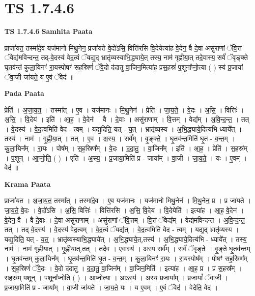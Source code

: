 \documentclass[17pt]{extarticle}
\begin{document}
\section*{ TS 1.7.4.6 }

\textbf{TS 1.7.4.6 } \newline
\textbf{Samhita Paata} \newline

प्राजा॑यत॒ तस्मा॑दे॒व यज॑मानो मिथु॒नेन॒ प्रजा॑यते वे॒दो॑ऽसि॒ वित्ति॑रसि वि॒देयेत्या॑ह वे॒देन॒ वै दे॒वा असु॑राणां ॅवि॒त्तं ॅवेद्य॑मविन्दन्त॒ तद्-वे॒दस्य॑ वेद॒त्वं ॅयद्य॒द् भ्रातृ॑व्यस्याभि॒द्ध्याये॒त् तस्य॒ नाम॑ गृह्णीया॒त् तदे॒वास्य॒ सर्वं॑ ॅवृङ्क्ते घृ॒तव॑न्तं कुला॒यिनꣳ॑ रा॒यस्पोषꣳ॑ सह॒स्रिणं॑ ॅवे॒दो द॑दातु वा॒जिन॒मित्या॑ह॒ प्रस॒हस्रं॑ प॒शूना᳚प्नो॒त्या ( ) स्य॑ प्र॒जायां᳚ ॅवा॒जी जा॑यते॒ य ए॒वं ॅवेद॑ ॥ \newline

\textbf{Pada Paata} \newline

प्रेति॑ । अ॒जा॒य॒त॒ । तस्मा᳚त् । ए॒व । यज॑मानः । मि॒थु॒नेन॑ । प्रेति॑ । जा॒य॒ते॒ । वे॒दः । अ॒सि॒ । वित्तिः॑ । अ॒सि॒ । वि॒देय॑ । इति॑ । आ॒ह॒ । वे॒देन॑ । वै । दे॒वाः । असु॑राणाम् । वि॒त्तम् । वेद्य᳚म् । अ॒वि॒न्द॒न्त॒ । तत् । वे॒दस्य॑ । वे॒द॒त्वमिति॑ वेद - त्वम् । यद्य॒दिति॒ यत् - य॒त् । भ्रातृ॑व्यस्य । अ॒भि॒द्ध्याये॒दित्य॑भि-ध्याये᳚त् । तस्य॑ । नाम॑ । गृ॒ह्णी॒या॒त् । तत् । ए॒व । अ॒स्य॒ । सर्व᳚म् । वृ॒ङ्क्ते॒ । घृ॒तव॑न्त॒मिति॑ घृ॒त - व॒न्त॒म् । कु॒ला॒यिन᳚म् । रा॒यः । पोष᳚म् । स॒ह॒स्रिण᳚म् । वे॒दः । द॒दा॒तु॒ । वा॒जिन᳚म् । इति॑ । आ॒ह॒ । प्रेति॑ । स॒हस्र᳚म् । प॒शून् । आ॒प्नो॒ति॒ ( ) । एति॑ । अ॒स्य॒ । प्र॒जाया॒मिति॑ प्र - जाया᳚म् । वा॒जी । जा॒य॒ते॒ । यः । ए॒वम् । वेद॑ ॥  \newline


\textbf{Krama Paata} \newline

प्राजा॑यत । अ॒जा॒य॒त॒ तस्मा᳚त् । तस्मा॑दे॒व । ए॒व यज॑मानः । यज॑मानो मिथु॒नेन॑ । मि॒थु॒नेन॒ प्र । प्र जा॑यते । जा॒य॒ते॒ वे॒दः । वे॒दो॑ऽसि । अ॒सि॒ वित्तिः॑ । वित्ति॑रसि । अ॒सि॒ वि॒देय॑ । वि॒देयेति॑ । इत्या॑ह । आ॒ह॒ वे॒देन॑ । वे॒देन॒ वै । वै दे॒वाः । दे॒वा असु॑राणाम् । असु॑राणां ॅवि॒त्तम् । वि॒त्तं ॅवेद्य᳚म् । वेद्य॑मविन्दन्त । अ॒वि॒न्द॒न्त॒ तत् । तद् वे॒दस्य॑ । वे॒दस्य॑ वेद॒त्वम् । वे॒द॒त्वं ॅयद्य॑त् । वे॒द॒त्वमिति॑ वेद - त्वम् । यद्य॒द् भ्रातृ॑व्यस्य । यद्य॒दिति॒ यत् - य॒त्॒ । भ्रातृ॑व्यस्याभि॒द्ध्याये᳚त् । अ॒भि॒द्ध्याये॒त्,तस्य॑ । अ॒भि॒द्ध्याये॒दित्य॑भि - ध्याये᳚त् । तस्य॒ नाम॑ । नाम॑ गृह्णीयात् । गृ॒ह्णी॒या॒त्,तत् । तदे॒व । ए॒वास्य॑ । अ॒स्य॒ सर्व᳚म् । सर्वं॑ ॅवृङ्ते । वृ॒ङ्ते॒ घृ॒तव॑न्तम् । घृ॒तव॑न्तम् कुला॒यिन᳚म् । घृ॒तव॑न्त॒मिति॑ घृ॒त - व॒न्त॒म् । कु॒ला॒यिनꣳ॑ रा॒यः । रा॒यस्पोष᳚म् । पोषꣳ॑ सह॒स्रिण᳚म् । स॒ह॒स्रिणं॑ ॅवे॒दः । वे॒दो द॑दातु । द॒दा॒तु॒ वा॒जिन᳚म् । वा॒जिन॒मिति॑ । इत्या॑ह । आ॒ह॒ प्र । प्र स॒हस्र᳚म् । स॒हस्र॑म् प॒शून् । प॒शूना᳚प्नोति ( ) । आ॒प्नो॒त्या । आऽस्य॑ । अ॒स्य॒ प्र॒जाया᳚म् । प्र॒जायां᳚ ॅवा॒जी । प्र॒जाया॒मिति॑ प्र - जाया᳚म् । वा॒जी जा॑यते । जा॒य॒ते॒ यः । य ए॒वम् । ए॒वं ॅवेद॑ । वेदेति॒ वेद॑ । \newline
\end{document}
